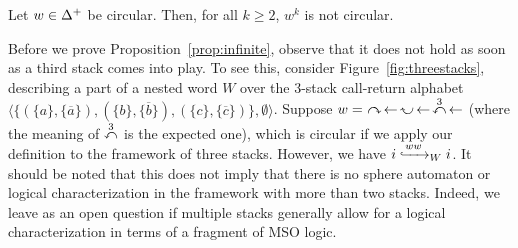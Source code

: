 \documentclass{LMCS}
\begin{document}
\begin{prop}\label{prop:infinite}
  Let $w \in \Dir^+$ be circular. Then, for all $k \ge 2$, $w^k$ is not
  circular.
\end{prop}

Before we prove Proposition~\ref{prop:infinite}, observe that it does not hold
as soon as a third stack comes into play. To see this, consider
Figure~\ref{fig:threestacks}, describing a part of a nested word $W$ over the
$3$-stack call-return alphabet $\langle
\{(\{a\},\{\overline{a}\}),(\{b\},\{\overline{b}\}),(\{c\},\{\overline{c}\})\},\emptyset
\rangle$. Suppose $w=~ \rightone ~\! \leftarrow ~\! \lefttwo ~\! \leftarrow
~\! \leftthree ~\! \leftarrow$ (where the meaning of $\leftthree$ is the
expected one), which is circular if we apply our definition to the framework
of three stacks. However, we have $\Wleadsto{W}{ww}{i}{i}$. It should be noted
that this does not imply that there is no sphere automaton or logical
characterization in the framework with more than two stacks. Indeed, we leave
as an open question if multiple stacks generally allow for a logical
characterization in terms of a fragment of MSO logic.
\end{document}
